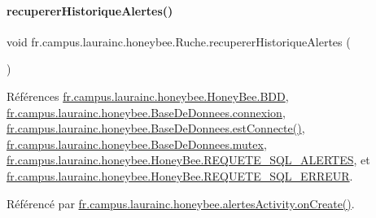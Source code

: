 \mbox{\label{classfr_1_1campus_1_1laurainc_1_1honeybee_1_1_ruche_ace10a52a470257f2b8f161fc3c7b9f15}} 
\paragraph{\texorpdfstring{recuperer\+Historique\+Alertes()}{recupererHistoriqueAlertes()}}
{\footnotesize\ttfamily void fr.\+campus.\+laurainc.\+honeybee.\+Ruche.\+recuperer\+Historique\+Alertes (\begin{DoxyParamCaption}{ }\end{DoxyParamCaption})}



Références \hyperlink{classfr_1_1campus_1_1laurainc_1_1honeybee_1_1_honey_bee_abfb4f6cc1c8bb793c37ccb8408abc51c}{fr.\+campus.\+laurainc.\+honeybee.\+Honey\+Bee.\+B\+DD}, \hyperlink{classfr_1_1campus_1_1laurainc_1_1honeybee_1_1_base_de_donnees_a358899633f17b8cd00dd2c4cfdd40abe}{fr.\+campus.\+laurainc.\+honeybee.\+Base\+De\+Donnees.\+connexion}, \hyperlink{classfr_1_1campus_1_1laurainc_1_1honeybee_1_1_base_de_donnees_a735f54c2c183a595c9a9a5ba947491f5}{fr.\+campus.\+laurainc.\+honeybee.\+Base\+De\+Donnees.\+est\+Connecte()}, \hyperlink{classfr_1_1campus_1_1laurainc_1_1honeybee_1_1_base_de_donnees_a0dd6f285a11459c086adea6080bed282}{fr.\+campus.\+laurainc.\+honeybee.\+Base\+De\+Donnees.\+mutex}, \hyperlink{classfr_1_1campus_1_1laurainc_1_1honeybee_1_1_honey_bee_a30fce22196d286c02fbcdd7629401c8a}{fr.\+campus.\+laurainc.\+honeybee.\+Honey\+Bee.\+R\+E\+Q\+U\+E\+T\+E\+\_\+\+S\+Q\+L\+\_\+\+A\+L\+E\+R\+T\+ES}, et \hyperlink{classfr_1_1campus_1_1laurainc_1_1honeybee_1_1_honey_bee_a275b7a8582c8193ff444d21928ef7e36}{fr.\+campus.\+laurainc.\+honeybee.\+Honey\+Bee.\+R\+E\+Q\+U\+E\+T\+E\+\_\+\+S\+Q\+L\+\_\+\+E\+R\+R\+E\+UR}.



Référencé par \hyperlink{classfr_1_1campus_1_1laurainc_1_1honeybee_1_1alertes_activity_ade0f23cba3f8f4aaa65367baea096d88}{fr.\+campus.\+laurainc.\+honeybee.\+alertes\+Activity.\+on\+Create()}.



